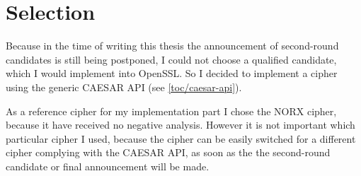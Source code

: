 \section{Selection}
\label{toc/caesar-selection}

Because in the time of writing this thesis the announcement of second-round candidates is still being postponed, I could not choose a qualified candidate, which I would implement into OpenSSL. So I decided to implement a cipher using the generic CAESAR API (see \autoref{toc/caesar-api}).

As a reference cipher for my implementation part I chose the NORX cipher, because it have received no negative analysis. However it is not important which particular cipher I used, because the cipher can be easily switched for a different cipher complying with the CAESAR API, as soon as the the second-round candidate or final announcement will be made.

